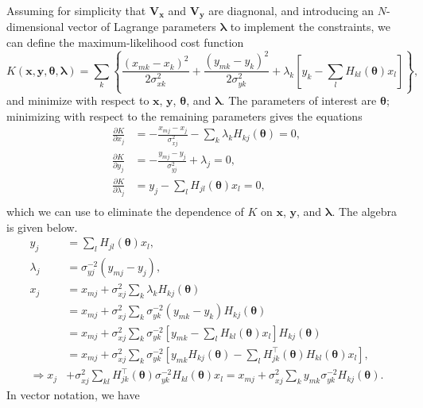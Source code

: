\documentclass[aps, prb, onecolumn, floatfix, amssymb, superscriptaddress, nofootinbib, longbibliography]{revtex4-2}
\begin{document}
Assuming for simplicity that $\bm{V_x}$ and $\bm{V_y}$ are diagnonal, and introducing an $N$-dimensional vector of Lagrange parameters $\bm{\lambda}$ to implement the constraints, we can define the maximum-likelihood cost function
\[
K(\mathbf{x},\mathbf{y},\boldsymbol{\theta},\boldsymbol{\lambda}) = \sum_k\left\{\frac{(x_{mk} - x_{k})^2}{2\sigma_{xk}^2} + \frac{(y_{mk} - y_{k})^2}{2\sigma_{yk}^2} + \lambda_k\left[y_k - \sum_{l}H_{kl}(\boldsymbol{\theta})x_l\right]\right\},
\]
and minimize with respect to $\bm{x}$, $\bm{y}$, $\bm{\theta}$, and $\bm{\lambda}$. The parameters of interest are $\bm{\theta}$; minimizing with respect to the remaining parameters gives the equations
\begin{align}
\frac{\partial K}{\partial x_j} & = -\frac{x_{mj} - x_{j}}{\sigma_{xj}^2} - \sum_{k}\lambda_{k}H_{kj}(\boldsymbol{\theta}) = 0,\\
\frac{\partial K}{\partial y_j} & = -\frac{y_{mj} - y_{j}}{\sigma_{yj}^2} + \lambda_{j} = 0,\\
\frac{\partial K}{\partial \lambda_j} & = y_{j} - \sum_{l}H_{jl}(\boldsymbol{\theta})x_l = 0,\\
\end{align}
which we can use to eliminate the dependence of $K$ on $\bm{x}$, $\bm{y}$, and $\bm{\lambda}$. The algebra is given below.
\begin{align}
y_j &= \sum_{l}H_{jl}(\boldsymbol{\theta})x_l,\\
\lambda_j &= \sigma_{yj}^{-2}(y_{mj} - y_j),\\
x_j &= x_{mj} + \sigma_{xj}^2\sum_{k}\lambda_k H_{kj}(\boldsymbol{\theta})\\
&= x_{mj} + \sigma_{xj}^2\sum_k\sigma_{yk}^{-2}(y_{mk} - y_k)H_{kj}(\boldsymbol{\theta})\\
&= x_{mj} + \sigma_{xj}^2\sum_k\sigma_{yk}^{-2}\left[y_{mk} - \sum_l H_{kl}(\boldsymbol{\theta})x_l\right]H_{kj}(\boldsymbol{\theta})\\
&= x_{mj} + \sigma_{xj}^2\sum_k\sigma_{yk}^{-2}\left[y_{mk}H_{kj}(\boldsymbol{\theta}) - \sum_l H_{jk}^\intercal(\boldsymbol{\theta})H_{kl}(\boldsymbol{\theta})x_l\right],\\
\Rightarrow x_j &+ \sigma_{xj}^2\sum_{kl}H_{jk}^\intercal(\boldsymbol{\theta})\sigma_{yk}^{-2}H_{kl}(\boldsymbol{\theta})x_l = x_{mj} + \sigma_{xj}^2\sum_k y_{mk}\sigma_{yk}^{-2}H_{kj}(\boldsymbol{\theta}).
\end{align}
In vector notation, we have
\end{document}

